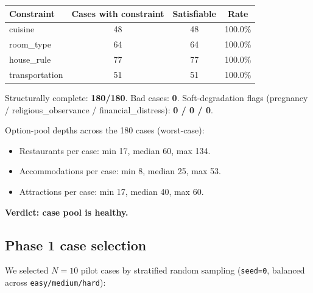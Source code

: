 \documentclass[11pt,a4paper]{article}
\begin{document}
\begin{center}
\small
\begin{tabular}{lccc}
\toprule
Constraint & Cases with constraint & Satisfiable & Rate \\
\midrule
cuisine        & 48 & 48 & 100.0\% \\
room\_type     & 64 & 64 & 100.0\% \\
house\_rule    & 77 & 77 & 100.0\% \\
transportation & 51 & 51 & 100.0\% \\
\bottomrule
\end{tabular}
\end{center}

Structurally complete: \textbf{180/180}. Bad cases: \textbf{0}.
Soft-degradation flags (pregnancy / religious\_observance / financial\_distress):
\textbf{0 / 0 / 0}.

Option-pool depths across the 180 cases (worst-case):
\begin{itemize}[leftmargin=2em, itemsep=1pt]
\item Restaurants per case: min 17, median 60, max 134.
\item Accommodations per case: min 8, median 25, max 53.
\item Attractions per case: min 17, median 40, max 60.
\end{itemize}

\textbf{Verdict: case pool is healthy.}

\subsection{Phase 1 case selection}

We selected $N{=}10$ pilot cases by stratified random sampling
(\texttt{seed=0}, balanced across \texttt{easy/medium/hard}):
\end{document}

